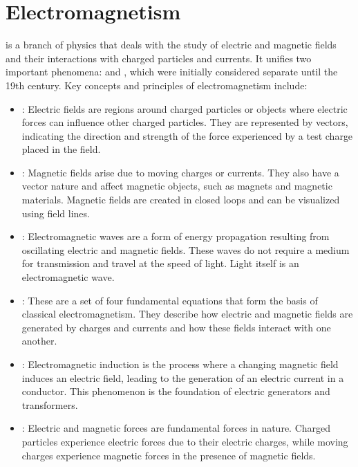 \chapter{Electromagnetism}
\thispagestyle{fancy}

 is a branch of physics that deals with the study of electric and magnetic fields and their interactions with charged particles and currents. It unifies two important phenomena:  and , which were initially considered separate until the 19th century. Key concepts and principles of electromagnetism include:

\begin{itemize}
	\item {}: Electric fields are regions around charged particles or objects where electric forces can influence other charged particles. They are represented by vectors, indicating the direction and strength of the force experienced by a test charge placed in the field.

	\item {}: Magnetic fields arise due to moving charges or currents. They also have a vector nature and affect magnetic objects, such as magnets and magnetic materials. Magnetic fields are created in closed loops and can be visualized using field lines.

	\item {}: Electromagnetic waves are a form of energy propagation resulting from oscillating electric and magnetic fields. These waves do not require a medium for transmission and travel at the speed of light. Light itself is an electromagnetic wave.

	\item {}: These are a set of four fundamental equations that form the basis of classical electromagnetism. They describe how electric and magnetic fields are generated by charges and currents and how these fields interact with one another.

	\item {}: Electromagnetic induction is the process where a changing magnetic field induces an electric field, leading to the generation of an electric current in a conductor. This phenomenon is the foundation of electric generators and transformers.

	\item {}: Electric and magnetic forces are fundamental forces in nature. Charged particles experience electric forces due to their electric charges, while moving charges experience magnetic forces in the presence of magnetic fields.
\end{itemize}

